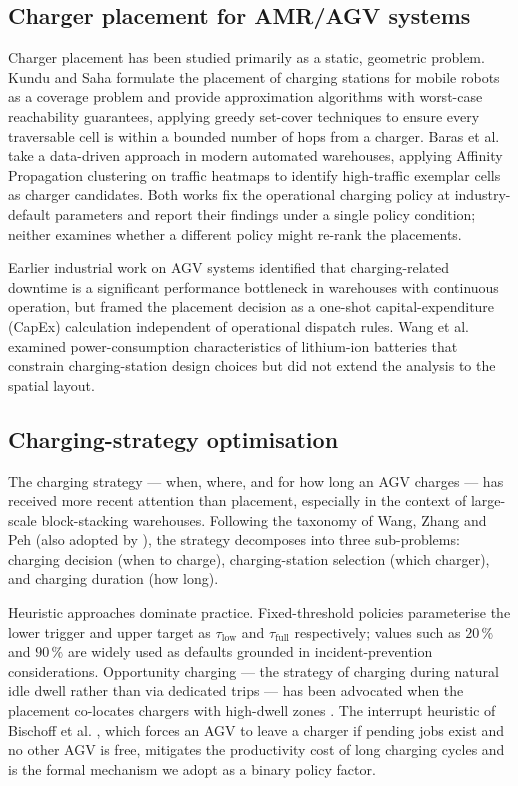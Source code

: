 \documentclass[conference]{IEEEtran}
\begin{document}
\subsection{Charger placement for AMR/AGV systems}

Charger placement has been studied primarily as a static, geometric problem. Kundu and Saha \cite{kundu2023} formulate the placement of charging stations for mobile robots as a coverage problem and provide approximation algorithms with worst-case reachability guarantees, applying greedy set-cover techniques to ensure every traversable cell is within a bounded number of hops from a charger. Baras et al. \cite{baras2023} take a data-driven approach in modern automated warehouses, applying Affinity Propagation clustering on traffic heatmaps to identify high-traffic exemplar cells as charger candidates. Both works fix the operational charging policy at industry-default parameters and report their findings under a single policy condition; neither examines whether a different policy might re-rank the placements.

Earlier industrial work on AGV systems \cite{vis2006,dekoster2007} identified that charging-related downtime is a significant performance bottleneck in warehouses with continuous operation, but framed the placement decision as a one-shot capital-expenditure (CapEx) calculation independent of operational dispatch rules. Wang et al. \cite{wang2014} examined power-consumption characteristics of lithium-ion batteries that constrain charging-station design choices but did not extend the analysis to the spatial layout.

\subsection{Charging-strategy optimisation}

The charging strategy --- when, where, and for how long an AGV charges --- has received more recent attention than placement, especially in the context of large-scale block-stacking warehouses. Following the taxonomy of Wang, Zhang and Peh \cite{wang2014} (also adopted by \cite{bischoff2025}), the strategy decomposes into three sub-problems: charging decision (when to charge), charging-station selection (which charger), and charging duration (how long).

Heuristic approaches dominate practice. Fixed-threshold policies \cite{shaukat2022,colling2019} parameterise the lower trigger and upper target as $\tau_\text{low}$ and $\tau_\text{full}$ respectively; values such as $20\,\%$ and $90\,\%$ are widely used as defaults grounded in incident-prevention considerations. Opportunity charging --- the strategy of charging during natural idle dwell rather than via dedicated trips --- has been advocated when the placement co-locates chargers with high-dwell zones \cite{ebben2001}. The interrupt heuristic of Bischoff et al. \cite{bischoff2025}, which forces an AGV to leave a charger if pending jobs exist and no other AGV is free, mitigates the productivity cost of long charging cycles and is the formal mechanism we adopt as a binary policy factor.
\end{document}
